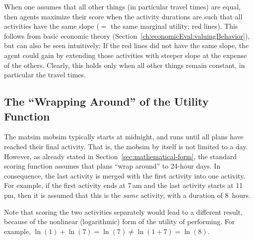 When one assumes that all other things (in particular travel times) are equal, then agents maximize their score when the activity durations are such that all activities have the same slope ($=$ the same marginal utility; red lines).  This follows from basic economic theory (\cf Section~\ref{ch:economicEval:valuingBehavior}), but can also be seen intuitively: If the red lines did not have the same slope, the agent could gain by extending those activities with steeper slope at the expense of the others.  Clearly, this holds only when all other things remain constant, in particular the travel times.

\subsection{The \enquote{Wrapping Around} of the Utility Function}
\label{sec:wrap-around}
The \gls{matsim} \gls{mobsim} typically starts at midnight, and runs until all plans have reached their final activity.  That is, the \gls{mobsim} by itself is not limited to a day.  However, as already stated in Section~\ref{sec:mathematical-form}, the standard scoring function assumes that plans ``wrap around'' to 24-hour days.  In consequence, the last activity is merged with the first activity into one activity. For example, if the first activity ends at 7\,am and the last activity starts at 11\,pm, then it is assumed that this is the \emph{same} activity, with a duration of 8~hours.

Note that scoring the two activities separately would lead to a different result, because of the nonlinear (logarithmic) form of the utility of performing. For example, $\ln(1) + \ln(7) = \ln(7) \ne \ln(1 + 7) = \ln(8)$.

